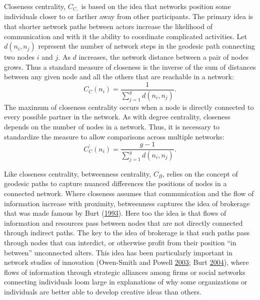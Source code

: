 \documentclass[]{krantz}
\begin{document}
Closeness centrality, \(C_{C,}\) is based on the idea that networks
position some individuals closer to or farther away from other
participants. The primary idea is that shorter network paths between
actors increase the likelihood of communication and with it the ability
to coordinate complicated activities. Let \(d(n_{i}, n_{j})\) represent
the number of network steps in the geodesic path connecting two nodes
\(i\) and \(j\). As \(d\) increases, the network distance between a pair
of nodes grows. Thus a standard measure of closeness is the inverse of
the sum of distances between any given node and all the others that are
reachable in a network: \[C_C(n_i) = \frac{1}{\sum_{j=1}^gd(n_i,n_j)}.\]
The maximum of closeness centrality occurs when a node is directly
connected to every possible partner in the network. As with degree
centrality, closeness depends on the number of nodes in a network. Thus,
it is necessary to standardize the measure to allow comparisons across
multiple networks:
\[C_C^{\prime}(n_i)=\frac{g-1}{\sum_{j=1}^gd(n_i,n_j)}.\]

Like closeness centrality, betweenness centrality, \(C_{B}\), relies on
the concept of geodesic paths to capture nuanced differences the
positions of nodes in a connected network. Where closeness assumes that
communication and the flow of information increase with proximity,
betweenness captures the idea of brokerage that was made famous by Burt
(\protect\hyperlink{ref-burt1993social}{1993}). Here too the idea is
that flows of information and resources pass between nodes that are not
directly connected through indirect paths. The key to the idea of
brokerage is that such paths pass through nodes that can interdict, or
otherwise profit from their position ``in between'' unconnected alters.
This idea has been particularly important in network studies of
innovation (Owen-Smith and Powell
\protect\hyperlink{ref-owen2003expanding}{2003}; Burt
\protect\hyperlink{ref-burt2004structural}{2004}), where flows of
information through strategic alliances among firms or social networks
connecting individuals loom large in explanations of why some
organizations or individuals are better able to develop creative ideas
than others.
\end{document}
